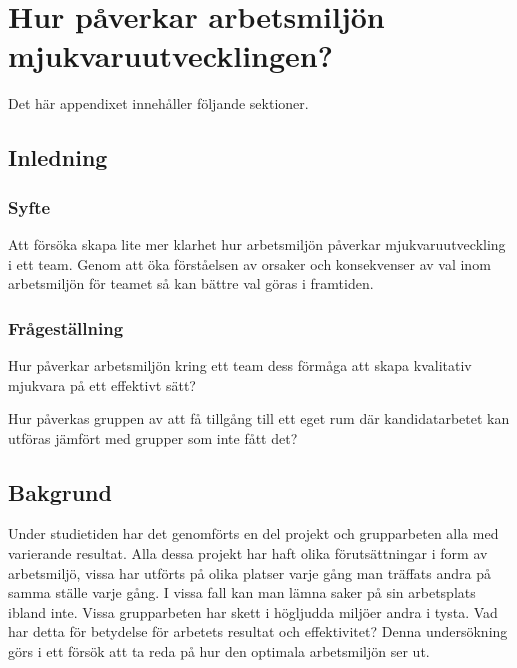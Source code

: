 \chapter{Hur påverkar arbetsmiljön mjukvaruutvecklingen?}
\label{cha:indiv-report-person}

Det här appendixet innehåller följande sektioner.

\section{Inledning}
\label{sec:introduction-person}


\subsection{Syfte}
\label{sec:purpose-person}

Att försöka skapa lite mer klarhet hur  arbetsmiljön påverkar mjukvaruutveckling i ett team. Genom att öka förståelsen av orsaker och konsekvenser av val inom arbetsmiljön för teamet så kan bättre val göras i framtiden.

\subsection{Frågeställning}
\label{sec:issue-person}

Hur påverkar arbetsmiljön kring ett team dess förmåga att skapa kvalitativ mjukvara på ett effektivt sätt?

Hur påverkas gruppen av att få tillgång till ett eget rum där kandidatarbetet kan utföras jämfört med grupper som inte fått det?

\section{Bakgrund}
\label{sec:background-person}

Under studietiden har det genomförts en del projekt och grupparbeten alla med varierande resultat. Alla dessa projekt har haft olika förutsättningar i form av arbetsmiljö, vissa har utförts på olika platser varje gång man träffats andra på samma ställe varje gång. I vissa fall kan man lämna saker på sin arbetsplats ibland inte. Vissa grupparbeten har skett i högljudda miljöer andra i tysta. Vad har detta för betydelse för arbetets resultat och effektivitet? Denna undersökning görs i ett försök att ta reda på hur den optimala arbetsmiljön ser ut. 

